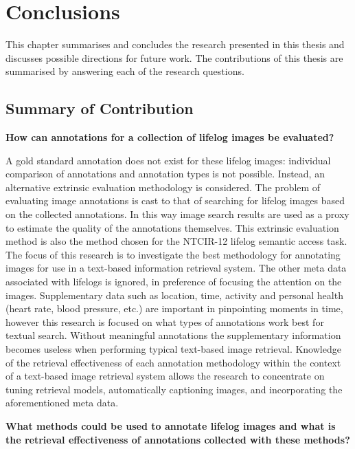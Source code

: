 \chapter{Conclusions}

This chapter summarises and concludes the research presented in this thesis and discusses possible directions for future work. The contributions of this thesis are summarised by answering each of the research questions. %

\section{Summary of Contribution}

\textbf{How can annotations for a collection of lifelog images be evaluated?}

A gold standard annotation does not exist for these lifelog images: individual comparison of annotations and annotation types is not possible. Instead, an alternative extrinsic evaluation methodology is considered. The problem of evaluating image annotations is cast to that of searching for lifelog images based on the collected annotations. In this way image search results are used as a proxy to estimate the quality of the annotations themselves. This extrinsic evaluation method is also the method chosen for the NTCIR-12 lifelog semantic access task. The focus of this research is to investigate the best methodology for annotating images for use in a text-based information retrieval system. The other meta data associated with lifelogs is ignored, in preference of focusing the attention on the images. Supplementary data such as location, time, activity and personal health (heart rate, blood pressure, etc.) are important in pinpointing moments in time, however this research is focused on what types of annotations work best for textual search. Without meaningful annotations the supplementary information becomes useless when performing typical text-based image retrieval. Knowledge of the retrieval effectiveness of each annotation methodology within the context of a text-based image retrieval system allows the research to concentrate on tuning retrieval models, automatically captioning images, and incorporating the aforementioned meta data. 

\textbf{What methods could be used to annotate lifelog images and what is the retrieval effectiveness of annotations collected with these methods?}

